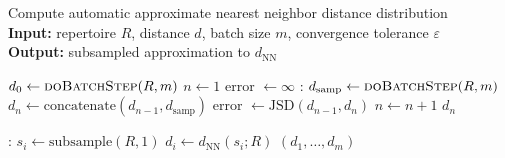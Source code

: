 \documentclass{article}
\begin{document}
\begin{algorithm}
    \caption{Compute automatic approximate nearest neighbor distance distribution\\
        \textbf{Input:} repertoire $R$, distance $d$, batch size $m$, convergence tolerance $\varepsilon$\\
        \textbf{Output:} subsampled approximation to $d_\text{NN}$}
    \label{alg:NNDistributionAveraging}
    \begin{algorithmic}
        \State $d_0 \gets \Call{doBatchStep}{R, m}$
        \State $n \gets 1$
        \State error $\gets \infty$
        :
        	\State $d_\text{samp} \gets \Call{doBatchStep}{R, m}$
        	\State $d_n \gets \text{concatenate}(d_{n-1}, d_\text{samp})$
        	\State error $\gets \text{JSD}(d_{n-1}, d_n)$
        	\State $n \gets n + 1$
        \EndWhile
            \Return $d_n$
    \end{algorithmic}
    \begin{algorithmic}
    :
		\State $s_i \gets \text{subsample}(R, 1)$
        \State $d_i \gets d_\text{NN}(s_i; R)$
	\EndFor
	\Return $(d_1, \dotsc, d_m)$
	\EndFunction
    \end{algorithmic}
\end{algorithm}
\end{document}
